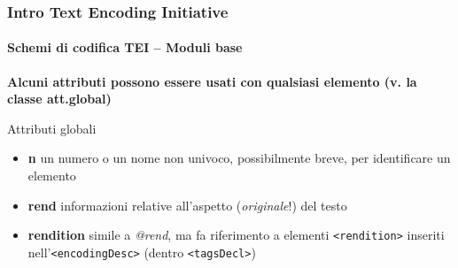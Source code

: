






\begin{frame}
	\frametitle{Intro Text Encoding Initiative}
	\framesubtitle{Schemi di codifica TEI – Moduli base}
	\addtocounter{nframe}{1}

    \textbf{Alcuni attributi possono essere usati con qualsiasi elemento (v. la classe att.global)}

    \begin{block}{ Attributi globali}
        \begin{itemize}
            \item \textbf{n} un numero o un nome non univoco, possibilmente breve, per identificare un elemento
            \item \textbf{rend} informazioni relative all’aspetto (\textit{originale}!) del testo
            \item \textbf{rendition} simile a \textit{@rend}, ma fa riferimento a elementi
            \texttt{<rendition>} inseriti nell’\texttt{<encodingDesc>} (dentro \texttt{<tagsDecl>})
        \end{itemize}
    \end{block}
\end{frame}

